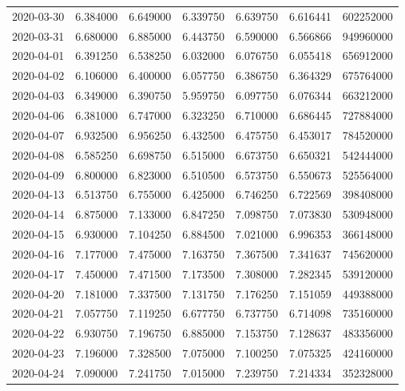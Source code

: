 \begin{tabular}{lrrrrrr}
2020-03-30 &    6.384000 &    6.649000 &    6.339750 &    6.639750 &    6.616441 &   602252000 \\
2020-03-31 &    6.680000 &    6.885000 &    6.443750 &    6.590000 &    6.566866 &   949960000 \\
2020-04-01 &    6.391250 &    6.538250 &    6.032000 &    6.076750 &    6.055418 &   656912000 \\
2020-04-02 &    6.106000 &    6.400000 &    6.057750 &    6.386750 &    6.364329 &   675764000 \\
2020-04-03 &    6.349000 &    6.390750 &    5.959750 &    6.097750 &    6.076344 &   663212000 \\
2020-04-06 &    6.381000 &    6.747000 &    6.323250 &    6.710000 &    6.686445 &   727884000 \\
2020-04-07 &    6.932500 &    6.956250 &    6.432500 &    6.475750 &    6.453017 &   784520000 \\
2020-04-08 &    6.585250 &    6.698750 &    6.515000 &    6.673750 &    6.650321 &   542444000 \\
2020-04-09 &    6.800000 &    6.823000 &    6.510500 &    6.573750 &    6.550673 &   525564000 \\
2020-04-13 &    6.513750 &    6.755000 &    6.425000 &    6.746250 &    6.722569 &   398408000 \\
2020-04-14 &    6.875000 &    7.133000 &    6.847250 &    7.098750 &    7.073830 &   530948000 \\
2020-04-15 &    6.930000 &    7.104250 &    6.884500 &    7.021000 &    6.996353 &   366148000 \\
2020-04-16 &    7.177000 &    7.475000 &    7.163750 &    7.367500 &    7.341637 &   745620000 \\
2020-04-17 &    7.450000 &    7.471500 &    7.173500 &    7.308000 &    7.282345 &   539120000 \\
2020-04-20 &    7.181000 &    7.337500 &    7.131750 &    7.176250 &    7.151059 &   449388000 \\
2020-04-21 &    7.057750 &    7.119250 &    6.677750 &    6.737750 &    6.714098 &   735160000 \\
2020-04-22 &    6.930750 &    7.196750 &    6.885000 &    7.153750 &    7.128637 &   483356000 \\
2020-04-23 &    7.196000 &    7.328500 &    7.075000 &    7.100250 &    7.075325 &   424160000 \\
2020-04-24 &    7.090000 &    7.241750 &    7.015000 &    7.239750 &    7.214334 &   352328000 \\

\end{tabular}
